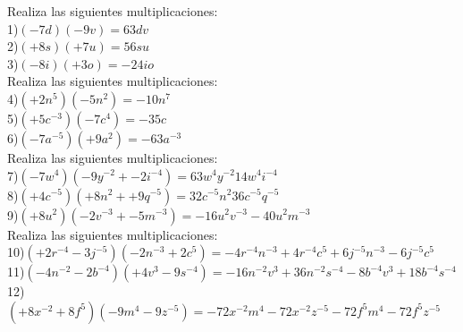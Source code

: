 \documentclass[a4paper,12pt]{article}
\begin{document}
 \pagebreak 
Realiza las siguientes multiplicaciones: \vspace{1cm}\\ 
1)$(-7d)(-9v)=63dv $\vspace{1cm}\\ 
2)$(+8s)(+7u)=56su $\vspace{1cm}\\ 
3)$(-8i)(+3o)=-24io $\vspace{1cm}\\ 
Realiza las siguientes multiplicaciones: \vspace{1cm}\\ 
4)$(+2n^{5})(-5n^{2} )=-10n^{7} $\vspace{1cm}\\ 
5)$(+5c^{-3})(-7c^{4} )=-35c $\vspace{1cm}\\ 
6)$(-7a^{-5})(+9a^{2} )=-63a^{-3} $\vspace{1cm}\\ 
Realiza las siguientes multiplicaciones: \vspace{1cm}\\ 
7)$(-7w^{4})(-9y^{-2}+-2i^{-4} )= 63w^{4}y^{-2}14w^{4}i^{-4}   $\vspace{1cm}\\ 
8)$(+4c^{-5})(+8n^{2}++9q^{-5} )= 32c^{-5}n^{2}36c^{-5}q^{-5}   $\vspace{1cm}\\ 
9)$(+8u^{2})(-2v^{-3}+-5m^{-3} )= -16u^{2}v^{-3}-40u^{2}m^{-3}   $\vspace{1cm}\\ 
Realiza las siguientes multiplicaciones: \vspace{1cm}\\ 
10)$(+2r^{-4}-3j^{-5} )(-2n^{-3}+2c^{5} )= -4r^{-4}n^{-3}+4r^{-4}c^{5}+6j^{-5}n^{-3}-6j^{-5}c^{5}$\vspace{1cm}\\ 
11)$(-4n^{-2}-2b^{-4} )(+4v^{3}-9s^{-4} )= -16n^{-2}v^{3}+36n^{-2}s^{-4}-8b^{-4}v^{3}+18b^{-4}s^{-4}$\vspace{1cm}\\ 
12)$(+8x^{-2}+8f^{5} )(-9m^{4}-9z^{-5} )= -72x^{-2}m^{4}-72x^{-2}z^{-5}-72f^{5}m^{4}-72f^{5}z^{-5}$\vspace{1cm}\\ 

 \pagebreak 
\end{document}
